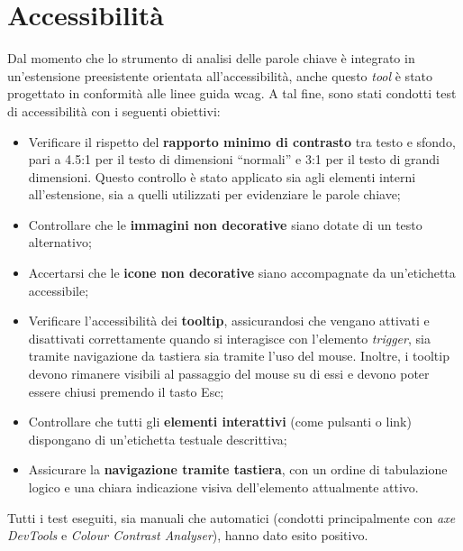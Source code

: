 \newpage

\section{Accessibilità}

\par Dal momento che lo strumento di analisi delle parole chiave è integrato in un’estensione preesistente orientata all’accessibilità, anche questo \textit{tool} è stato progettato in conformità alle linee guida \gls{wcag}. A tal fine, sono stati condotti test di accessibilità con i seguenti obiettivi:
\begin{itemize}
  \item Verificare il rispetto del \textbf{rapporto minimo di contrasto} tra testo e sfondo, pari a 4.5:1 per il testo di dimensioni “normali” e 3:1 per il testo di grandi dimensioni. Questo controllo è stato applicato sia agli elementi interni all’estensione, sia a quelli utilizzati per evidenziare le parole chiave;
  \item Controllare che le \textbf{immagini non decorative} siano dotate di un testo alternativo;
  \item Accertarsi che le \textbf{icone non decorative} siano accompagnate da un’etichetta accessibile;
  \item Verificare l’accessibilità dei \textbf{tooltip}, assicurandosi che vengano attivati e disattivati correttamente quando si interagisce con l’elemento \textit{trigger}, sia tramite navigazione da tastiera sia tramite l’uso del mouse. Inoltre, i tooltip devono rimanere visibili al passaggio del mouse su di essi e devono poter essere chiusi premendo il tasto Esc;
  \item Controllare che tutti gli \textbf{elementi interattivi} (come pulsanti o link) dispongano di un’etichetta testuale descrittiva;
  \item Assicurare la \textbf{navigazione tramite tastiera}, con un ordine di tabulazione logico e una chiara indicazione visiva dell’elemento attualmente attivo.
\end{itemize}

\vspace{15pt}
\par\noindent Tutti i test eseguiti, sia manuali che automatici (condotti principalmente con \textit{axe DevTools} e \textit{Colour Contrast Analyser}), hanno dato esito positivo.
